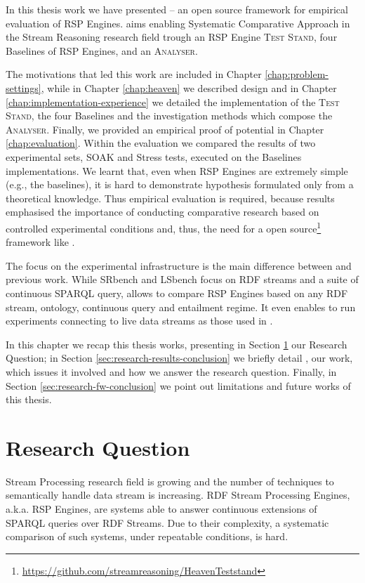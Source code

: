 In this thesis work we have presented \name -- an open source framework for empirical evaluation of RSP Engines. \name aims enabling Systematic Comparative Approach in the Stream Reasoning research field trough an RSP Engine \textsc{Test Stand}, four Baselines of RSP Engines, and an \textsc{Analyser}. 

The motivations that led this work are included in Chapter \ref{chap:problem-settings}, while in Chapter \ref{chap:heaven} we described \name design and in Chapter \ref{chap:implementation-experience} we detailed the implementation of the \textsc{Test Stand}, the four Baselines and the investigation methods which compose the \textsc{Analyser}. Finally, we provided an empirical proof of \name potential in Chapter \ref{chap:evaluation}. Within the evaluation we compared the results of two experimental sets, SOAK and Stress tests, executed on the Baselines implementations. We learnt that, even when RSP Engines are extremely simple (e.g., the baselines), it is hard to demonstrate hypothesis formulated only from a theoretical knowledge. Thus empirical evaluation is required, because results emphasised the importance of conducting comparative research based on controlled experimental conditions and, thus, the need for a open source\footnote{\url{https://github.com/streamreasoning/HeavenTeststand}} framework like \namens.

The focus on the experimental infrastructure is the main difference between \name and previous work. While SRbench and LSbench focus on RDF streams and a suite of continuous SPARQL query, \name allows to compare RSP Engines based on any RDF stream, ontology, continuous query and entailment regime. It even enables to run experiments connecting to live data streams as those used in \cite{DBLP:conf/semweb/BalduiniVDTPC13}.	

In this chapter we recap this thesis works, presenting in Section \ref{sec:research-question-conclusion} our Research Question; in Section \ref{sec:research-results-conclusion} we briefly detail \namens, our work, which issues it involved and how we answer the research question. Finally, in Section \ref{sec:research-fw-conclusion} we point out \name limitations and future works of this thesis.

\section{Research Question}\label{sec:research-question-conclusion}

Stream Processing research field is growing and the number of techniques to semantically handle data stream is increasing. RDF Stream Processing Engines, a.k.a. RSP Engines, are systems able to answer continuous extensions of SPARQL queries over RDF Streams. Due to their complexity, a systematic comparison of such systems, under repeatable conditions, is hard. 

